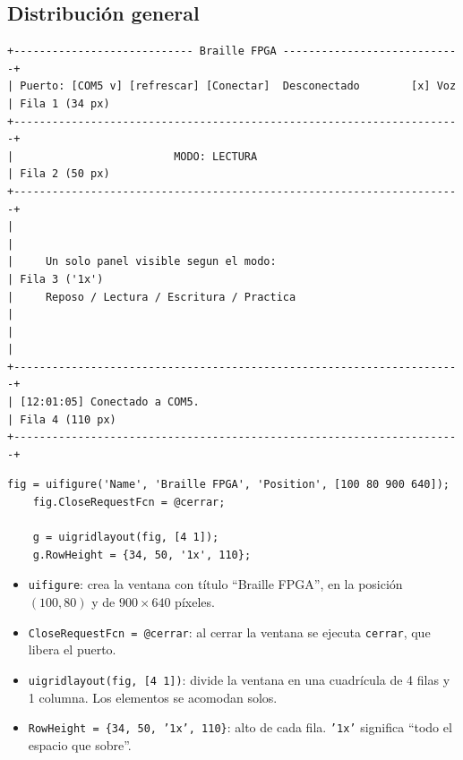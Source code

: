 \documentclass[11pt,a4paper]{article}
\newcommand{\cod}[1]{\texttt{#1}}
\begin{document}
\subsection{Distribución general}
\begin{diagrama}
\begin{verbatim}
+---------------------------- Braille FPGA ----------------------------+
| Puerto: [COM5 v] [refrescar] [Conectar]  Desconectado        [x] Voz | Fila 1 (34 px)
+----------------------------------------------------------------------+
|                         MODO: LECTURA                                | Fila 2 (50 px)
+----------------------------------------------------------------------+
|                                                                      |
|     Un solo panel visible segun el modo:                             | Fila 3 ('1x')
|     Reposo / Lectura / Escritura / Practica                          |
|                                                                      |
+----------------------------------------------------------------------+
| [12:01:05] Conectado a COM5.                                         | Fila 4 (110 px)
+----------------------------------------------------------------------+
\end{verbatim}
\end{diagrama}

\begin{lstlisting}[firstnumber=35]
    fig = uifigure('Name', 'Braille FPGA', 'Position', [100 80 900 640]);
    fig.CloseRequestFcn = @cerrar;

    g = uigridlayout(fig, [4 1]);
    g.RowHeight = {34, 50, '1x', 110};
\end{lstlisting}

\begin{itemize}
  \item \cod{uifigure}: crea la ventana con título ``Braille FPGA'', en la posición
        $(100, 80)$ y de $900 \times 640$ píxeles.
  \item \cod{CloseRequestFcn = @cerrar}: al cerrar la ventana se ejecuta
        \cod{cerrar}, que libera el puerto.
  \item \cod{uigridlayout(fig, [4 1])}: divide la ventana en una cuadrícula de 4
        filas y 1 columna. Los elementos se acomodan solos.
  \item \cod{RowHeight = \{34, 50, '1x', 110\}}: alto de cada fila. \cod{'1x'}
        significa ``todo el espacio que sobre''.
\end{itemize}
\end{document}
